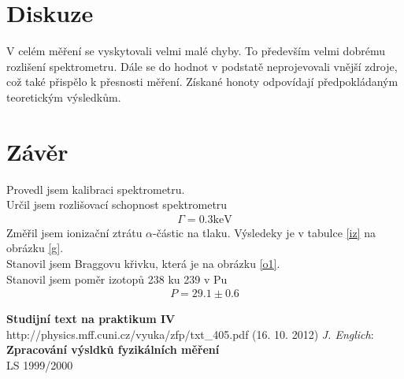 \documentclass[a4paper,12pt]{article}
\begin{document}
\section{Diskuze}
V celém měření se vyskytovali velmi malé chyby. To především velmi dobrému rozlišení spektrometru. 
Dále se do hodnot v podstatě neprojevovali vnější zdroje, což také přispělo k přesnosti měření. 
Získané honoty odpovídají předpokládaným teoretickým výsledkům.

\section{Závěr}
\noindent
Provedl jsem kalibraci spektrometru. \\
Určil jsem rozlišovací schopnost spektrometru
\begin{eqnarray}
\Gamma=0.3 \mbox{keV}
\end{eqnarray}
Změřil jsem ionizační ztrátu $\alpha$-částic na tlaku. Výsledeky je v tabulce \ref{iz} na obrázku \ref{g}. \\
Stanovil jsem Braggovu křivku, která je na obrázku \ref{o1}. \\
Stanovil jsem poměr izotopů 238 ku 239 v Pu
\begin{eqnarray}
P=29.1\pm 0.6
\end{eqnarray}

\begin{thebibliography}{5}
	 \textbf{Studijní text na praktikum IV} \\http://physics.mff.cuni.cz/vyuka/zfp/txt\_405.pdf (16. 10. 2012)
     \emph{J. Englich}: \textbf{Zpracování výsldků fyzikálních měření} \\ LS 1999/2000
\end{thebibliography}
\end{document}

